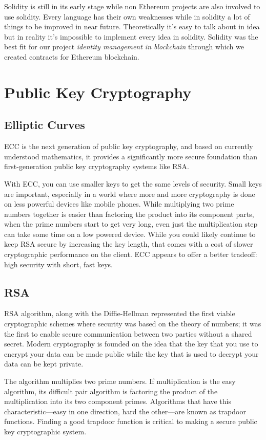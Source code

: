 Solidity is still in its early stage while non Ethereum projects are also involved to use solidity. Every language has their own weaknesses while in solidity a lot of things to be improved in near future. Theoretically it’s easy to talk about in idea but in reality it’s impossible to implement every idea in solidity. Solidity was the best fit for our project \textit{identity management in blockchain} through which we created contracts for Ethereum blockchain.

\section{Public Key Cryptography}

\subsection{Elliptic Curves}
ECC is the next generation of public key cryptography, and based on currently understood mathematics, it provides a significantly more secure foundation than first-generation public key cryptography systems like RSA.

With ECC, you can use smaller keys to get the same levels of security. Small keys are important, especially in a world where more and more cryptography is done on less powerful devices like mobile phones. While multiplying two prime numbers together is easier than factoring the product into its component parts, when the prime numbers start to get very long, even just the multiplication step can take some time on a low powered device. While you could likely continue to keep RSA secure by increasing the key length, that comes with a cost of slower cryptographic performance on the client. ECC appears to offer a better tradeoff: high security with short, fast keys.

\subsection{RSA}
RSA algorithm, along with the Diffie-Hellman represented the first viable cryptographic schemes where security was based on the theory of numbers; it was the first to enable secure communication between two parties without a shared secret.
Modern cryptography is founded on the idea that the key that you use to encrypt your data can be made public while the key that is used to decrypt your data can be kept private.

The algorithm multiplies two prime numbers. If multiplication is the easy algorithm, its difficult pair algorithm is factoring the product of the multiplication into its two component primes. Algorithms that have this characteristic—easy in one direction, hard the other—are known as trapdoor functions. Finding a good trapdoor function is critical to making a secure public key cryptographic system.


